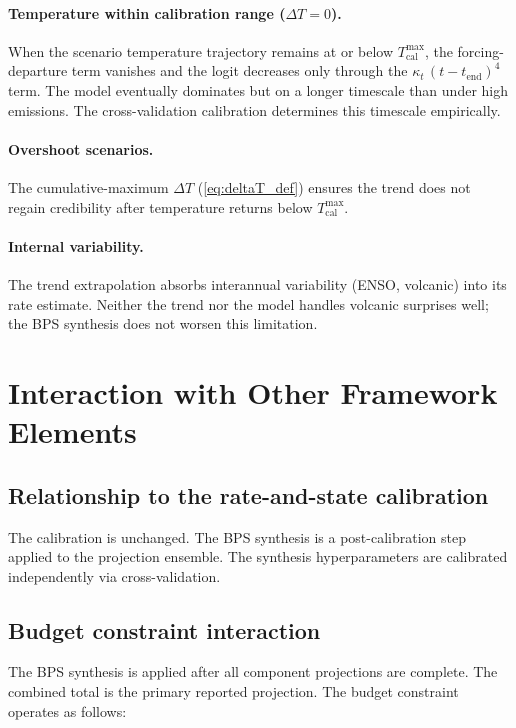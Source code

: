 \documentclass[11pt]{article}
\newcommand{\dT}{\Delta T}
\newcommand{\tcal}{T_{\mathrm{cal}}^{\max}}
\newcommand{\tend}{t_{\mathrm{end}}}
\begin{document}
\paragraph{Temperature within calibration range ($\dT = 0$).}  When the scenario temperature trajectory remains at or below $\tcal$, the forcing-departure term vanishes and the logit decreases only through the $\kappa_t\,(t - \tend)^4$ term.  The model eventually dominates but on a longer timescale than under high emissions.  The cross-validation calibration determines this timescale empirically.

\paragraph{Overshoot scenarios.}  The cumulative-maximum $\dT$ (\cref{eq:deltaT_def}) ensures the trend does not regain credibility after temperature returns below $\tcal$.

\paragraph{Internal variability.}  The trend extrapolation absorbs interannual variability (ENSO, volcanic) into its rate estimate.  Neither the trend nor the model handles volcanic surprises well; the BPS synthesis does not worsen this limitation.


\section{Interaction with Other Framework Elements}

\subsection{Relationship to the rate-and-state calibration}

The calibration is unchanged.  The BPS synthesis is a post-calibration step applied to the projection ensemble.  The synthesis hyperparameters are calibrated independently via cross-validation.

\subsection{Budget constraint interaction}

The BPS synthesis is applied after all component projections are complete.  The combined total is the primary reported projection.  The budget constraint operates as follows:
\end{document}

